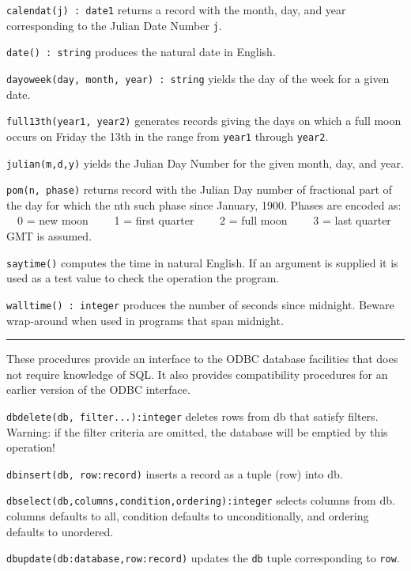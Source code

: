 \texttt{calendat(j) : date1} returns a record with the month, day, and
year corresponding to the Julian Date Number \texttt{j}.

\texttt{date() : string} produces the natural date in English.

\texttt{dayoweek(day, month, year) : string} yields the day of the
week for a given date.

\texttt{full13th(year1, year2)} generates records giving the days on
which a full moon occurs on Friday the 13th in the range from
\texttt{year1} through \texttt{year2}.

\texttt{julian(m,d,y)} yields the Julian Day Number for the given
month, day, and year.

\texttt{pom(n, phase)} returns record with the Julian Day number of
fractional part of the day for which the nth such phase since January,
1900. Phases are encoded as:\\
\ \ 0 = new moon \ \ \ \ 1 = first quarter \ \ \ \ 2 = full moon
\ \ \ \ 3 = last quarter\\
GMT is assumed.

\texttt{saytime()} computes the time in natural English. If an argument
is supplied it is used as a test value to check the operation the
program.

\texttt{walltime() : integer} produces the number of seconds since
midnight. Beware wrap-around when used in programs that span midnight.

\vspace{0.25cm}\hrule{}

These procedures provide an interface to the ODBC database facilities
that does not require knowledge of SQL. It also provides compatibility
procedures for an earlier version of the ODBC interface.

\texttt{dbdelete(db, filter...):integer} deletes rows from db that satisfy
filters. Warning: if the filter criteria are omitted, the
database will be emptied by this operation!

\texttt{dbinsert(db, row:record)} inserts a record as a tuple (row) into db.

\texttt{dbselect(db,columns,condition,ordering):integer} selects columns from db.
columns defaults to {\textquotedbl}all{\textquotedbl}, condition
defaults to unconditionally, and ordering defaults to unordered.

\texttt{dbupdate(db:database,row:record)} updates the \texttt{db} tuple
corresponding to \texttt{row}.

